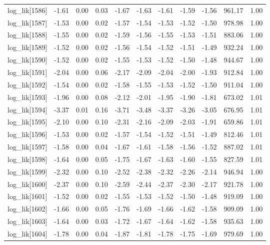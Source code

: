 \begin{table}[ht]
\begin{tabular}{rrrrrrrrrrr}
  log\_lik[1586] & -1.61 & 0.00 & 0.03 & -1.67 & -1.63 & -1.61 & -1.59 & -1.56 & 961.17 & 1.00 \\ 
  log\_lik[1587] & -1.53 & 0.00 & 0.02 & -1.57 & -1.54 & -1.53 & -1.52 & -1.50 & 978.98 & 1.00 \\ 
  log\_lik[1588] & -1.55 & 0.00 & 0.02 & -1.59 & -1.56 & -1.55 & -1.53 & -1.51 & 883.06 & 1.00 \\ 
  log\_lik[1589] & -1.52 & 0.00 & 0.02 & -1.56 & -1.54 & -1.52 & -1.51 & -1.49 & 932.24 & 1.00 \\ 
  log\_lik[1590] & -1.52 & 0.00 & 0.02 & -1.55 & -1.53 & -1.52 & -1.50 & -1.48 & 944.67 & 1.00 \\ 
  log\_lik[1591] & -2.04 & 0.00 & 0.06 & -2.17 & -2.09 & -2.04 & -2.00 & -1.93 & 912.84 & 1.00 \\ 
  log\_lik[1592] & -1.54 & 0.00 & 0.02 & -1.58 & -1.55 & -1.53 & -1.52 & -1.50 & 911.04 & 1.00 \\ 
  log\_lik[1593] & -1.96 & 0.00 & 0.08 & -2.12 & -2.01 & -1.95 & -1.90 & -1.81 & 673.02 & 1.01 \\ 
  log\_lik[1594] & -3.37 & 0.01 & 0.16 & -3.71 & -3.48 & -3.37 & -3.26 & -3.05 & 676.95 & 1.01 \\ 
  log\_lik[1595] & -2.10 & 0.00 & 0.10 & -2.31 & -2.16 & -2.09 & -2.03 & -1.91 & 659.86 & 1.01 \\ 
  log\_lik[1596] & -1.53 & 0.00 & 0.02 & -1.57 & -1.54 & -1.52 & -1.51 & -1.49 & 812.46 & 1.01 \\ 
  log\_lik[1597] & -1.58 & 0.00 & 0.04 & -1.67 & -1.61 & -1.58 & -1.56 & -1.52 & 887.02 & 1.01 \\ 
  log\_lik[1598] & -1.64 & 0.00 & 0.05 & -1.75 & -1.67 & -1.63 & -1.60 & -1.55 & 827.59 & 1.01 \\ 
  log\_lik[1599] & -2.32 & 0.00 & 0.10 & -2.52 & -2.38 & -2.32 & -2.26 & -2.14 & 946.94 & 1.00 \\ 
  log\_lik[1600] & -2.37 & 0.00 & 0.10 & -2.59 & -2.44 & -2.37 & -2.30 & -2.17 & 921.78 & 1.00 \\ 
  log\_lik[1601] & -1.52 & 0.00 & 0.02 & -1.55 & -1.53 & -1.52 & -1.50 & -1.48 & 919.09 & 1.00 \\ 
  log\_lik[1602] & -1.66 & 0.00 & 0.05 & -1.76 & -1.69 & -1.66 & -1.62 & -1.58 & 909.09 & 1.00 \\ 
  log\_lik[1603] & -1.64 & 0.00 & 0.03 & -1.72 & -1.67 & -1.64 & -1.62 & -1.58 & 935.63 & 1.00 \\ 
  log\_lik[1604] & -1.78 & 0.00 & 0.04 & -1.87 & -1.81 & -1.78 & -1.75 & -1.69 & 979.69 & 1.00 \\ 

\end{tabular}
\end{table}
